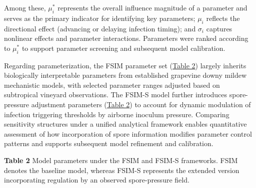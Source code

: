 \documentclass[
]{article}
\begin{document}
Among these, \(\mu_{i}^{*}\) represents the overall influence magnitude
of a parameter and serves as the primary indicator for identifying key
parameters; \(\mu_{i}\) reflects the directional effect (advancing or
delaying infection timing); and \(\sigma_{i}\) captures nonlinear effects
and parameter interactions. Parameters were ranked according to
\(\mu_{i}^{*}\) to support parameter screening and subsequent model
calibration.

Regarding parameterization, the FSIM parameter set
(\hyperref[_Ref226058574]{Table 2}) largely inherits biologically
interpretable parameters from established grapevine downy mildew
mechanistic models, with selected parameter ranges adjusted based on
subtropical vineyard observations. The FSIM-S model further introduces
spore-pressure adjustment parameters (\hyperref[_Ref226058574]{Table 2})
to account for dynamic modulation of infection triggering thresholds by
airborne inoculum pressure. Comparing sensitivity structures under a
unified analytical framework enables quantitative assessment of how
incorporation of spore information modifies parameter control patterns
and supports subsequent model refinement and calibration.

\protect{}\label{_Ref226058574}{}
\begin{center}
\textbf{Table 2} Model parameters under the FSIM and FSIM-S frameworks.
FSIM denotes the baseline model, whereas FSIM-S represents the extended
version incorporating regulation by an observed spore-pressure field.
\end{center}
\end{document}
